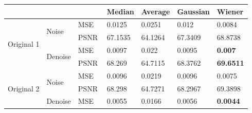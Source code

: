 \begin{center}
\begin{tabular}{llllllllllll|l|l|l|l|l|l|l|l|l|l|l|l|l|}
\cline{13-25}
           &            &            &            &            &            &          &          &       &      &      &     & \multicolumn{3}{l|}{Median}  & \multicolumn{3}{l|}{Average} & \multicolumn{4}{l|}{Gaussian} & \multicolumn{3}{l|}{Wiener}           \\ \hline
\multicolumn{4}{|l|}{\multirow{4}{*}{Original 1}} & \multicolumn{4}{l|}{\multirow{2}{*}{Noise}}   & \multicolumn{4}{l|}{MSE}  & \multicolumn{3}{l|}{0.0125}  & \multicolumn{3}{l|}{0.0251}  & \multicolumn{4}{l|}{0.012}    & \multicolumn{3}{l|}{0.0084}           \\ \cline{9-25} 
\multicolumn{4}{|l|}{}                            & \multicolumn{4}{l|}{}                         & \multicolumn{4}{l|}{PSNR} & \multicolumn{3}{l|}{67.1535} & \multicolumn{3}{l|}{64.1264} & \multicolumn{4}{l|}{67.3409}  & \multicolumn{3}{l|}{68.8738}          \\ \cline{5-25} 
\multicolumn{4}{|l|}{}                            & \multicolumn{4}{l|}{\multirow{2}{*}{Denoise}} & \multicolumn{4}{l|}{MSE}  & \multicolumn{3}{l|}{0.0097}  & \multicolumn{3}{l|}{0.022}   & \multicolumn{4}{l|}{0.0095}   & \multicolumn{3}{l|}{\textbf{0.007}}   \\ \cline{9-25} 
\multicolumn{4}{|l|}{}                            & \multicolumn{4}{l|}{}                         & \multicolumn{4}{l|}{PSNR} & \multicolumn{3}{l|}{68.269}  & \multicolumn{3}{l|}{64.7115} & \multicolumn{4}{l|}{68.3762}  & \multicolumn{3}{l|}{\textbf{69.6511}} \\ \hline
\multicolumn{4}{|l|}{\multirow{4}{*}{Original 2}} & \multicolumn{4}{l|}{\multirow{2}{*}{Noise}}   & \multicolumn{4}{l|}{MSE}  & \multicolumn{3}{l|}{0.0096}  & \multicolumn{3}{l|}{0.0219}  & \multicolumn{4}{l|}{0.0096}   & \multicolumn{3}{l|}{0.0075}           \\ \cline{9-25} 
\multicolumn{4}{|l|}{}                            & \multicolumn{4}{l|}{}                         & \multicolumn{4}{l|}{PSNR} & \multicolumn{3}{l|}{68.298}  & \multicolumn{3}{l|}{64.7271} & \multicolumn{4}{l|}{68.2967}  & \multicolumn{3}{l|}{69.3898}          \\ \cline{5-25} 
\multicolumn{4}{|l|}{}                            & \multicolumn{4}{l|}{\multirow{2}{*}{Denoise}} & \multicolumn{4}{l|}{MSE}  & \multicolumn{3}{l|}{0.0055}  & \multicolumn{3}{l|}{0.0166}  & \multicolumn{4}{l|}{0.0056}   & \multicolumn{3}{l|}{\textbf{0.0044}}  \\ \cline{9-25} 

\end{tabular}
\end{center}
